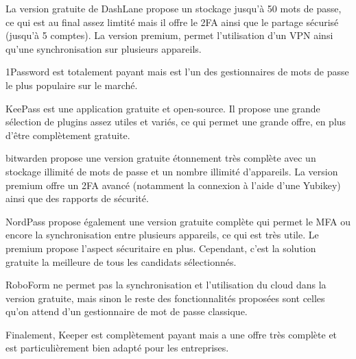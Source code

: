 La version gratuite de DashLane propose un stockage jusqu'à 50 mots de passe, ce qui est au final assez limtité mais il offre le 2FA ainsi que le partage sécurisé (jusqu'à 5 comptes). La version premium, permet l'utilisation d'un VPN ainsi qu'une synchronisation sur plusieurs appareils.

1Password est totalement payant mais est l'un des gestionnaires de mots de passe le plus populaire sur le marché.

KeePass est une application gratuite et open-source. Il propose une grande sélection de plugins assez utiles et variés, ce qui permet une grande offre, en plus d'être complètement gratuite.

bitwarden propose une version gratuite étonnement très complète avec un stockage illimité de mots de passe et un nombre illimité d'appareils. La version premium offre un 2FA avancé (notamment la connexion à l'aide d'une Yubikey) ainsi que des rapports de sécurité.

NordPass propose également une version gratuite complète qui permet le MFA ou encore la synchronisation entre plusieurs appareils, ce qui est très utile. Le premium propose l'aspect sécuritaire en plus. Cependant, c'est la solution gratuite la meilleure de tous les candidats sélectionnés.

RoboForm ne permet pas la synchronisation et l'utilisation du cloud dans la version gratuite, mais sinon le reste des fonctionnalités proposées sont celles qu'on attend d'un gestionnaire de mot de passe classique.

Finalement, Keeper est complètement payant mais a une offre très complète et est particulièrement bien adapté pour les entreprises.
